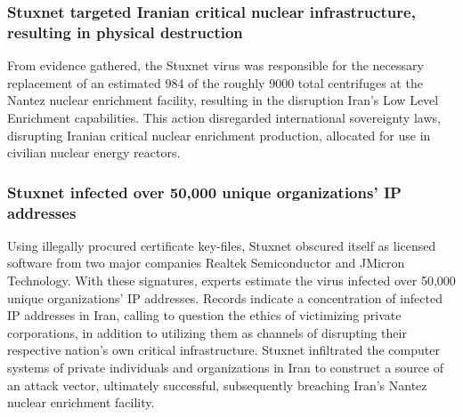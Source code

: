 \documentclass[12pt]{article}
\begin{document}
\begin{multicols}{2}
\subsubsection{Stuxnet targeted Iranian critical nuclear infrastructure, resulting in physical destruction}

From evidence gathered, the Stuxnet virus was responsible for the necessary replacement of an estimated 984 of the roughly 9000 total centrifuges at the Nantez nuclear enrichment facility, resulting in the disruption Iran's Low Level Enrichment capabilities.\cite{lookIntoIranianNuclearProgram} This action disregarded international sovereignty laws, disrupting Iranian critical nuclear enrichment production, allocated for use in civilian nuclear energy reactors.\cite{internationalSovereigntyDefinition}\footnotemark[2] 


\subsubsection{Stuxnet infected over 50,000 unique organizations' IP addresses}

Using illegally procured certificate key-files, Stuxnet obscured itself as licensed software from two major companies Realtek Semiconductor and JMicron Technology. With these signatures, experts estimate the virus infected over 50,000 unique organizations' IP addresses.\cite{lessonsFromStuxnet} Records indicate a concentration of infected IP addresses in Iran, calling to question the ethics of victimizing private corporations, in addition to  utilizing them as channels of disrupting their respective nation's own critical infrastructure. Stuxnet infiltrated the computer systems of private individuals and organizations in Iran to construct a source of an attack vector, ultimately successful, subsequently breaching Iran's Nantez nuclear enrichment facility.\cite{w32.stuxnetDossier} 


\end{multicols}
\end{document}
